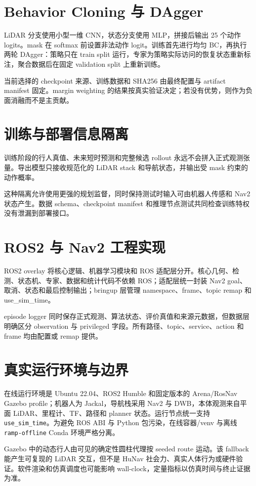 \documentclass[11pt,a4paper]{article}
\begin{document}
\clearpage
\section{Behavior Cloning 与 DAgger}
LiDAR 分支使用小型一维 CNN，状态分支使用 MLP，拼接后输出 25 个动作 logits。mask 在 softmax 前设置非法动作 logit。训练首先进行均匀 BC，再执行两轮 DAgger：策略只在 train split 运行，专家为策略实际访问的恢复状态重新标注，聚合数据后在固定 validation split 上重新训练。

当前选择的 checkpoint 来源、训练数据和 SHA256 由最终配置与 artifact manifest 固定。margin weighting 的结果按真实验证决定；若没有优势，则作为负面消融而不是主贡献。

\section{训练与部署信息隔离}
训练阶段的行人真值、未来短时预测和完整候选 rollout 永远不会拼入正式观测张量。导出模型只接收规范化的 LiDAR stack 和导航状态，并输出受 mask 约束的动作概率。

这种隔离允许使用更强的规划监督，同时保持测试时输入可由机器人传感和 Nav2 状态产生。数据 schema、checkpoint manifest 和推理节点测试共同检查训练特权没有泄漏到部署接口。

\section{ROS2 与 Nav2 工程实现}
ROS2 overlay 将核心逻辑、机器学习模块和 ROS 适配层分开。核心几何、检测、状态机、专家、数据和统计代码不依赖 ROS；适配层统一封装 Nav2 goal、取消、状态和最后控制输出；bringup 层管理 namespace、frame、topic remap 和 use\_sim\_time。

episode logger 同时保存正式观测、算法状态、评价真值和来源元数据，但数据层明确区分 observation 与 privileged 字段。所有路径、topic、service、action 和 frame 均由配置或 remap 提供。

\section{真实运行环境与边界}
在线运行环境是 Ubuntu 22.04、ROS2 Humble 和固定版本的 Arena/RosNav Gazebo profile；机器人为 Jackal，导航栈采用 Nav2 与 DWB，本体观测来自平面 LiDAR、里程计、TF、路径和 planner 状态。运行节点统一支持 \texttt{use\_sim\_time}。为避免 ROS ABI 与 Python 包污染，在线容器/venv 与离线 \texttt{ramp-offline} Conda 环境严格分离。

Gazebo 中的动态行人由可见的确定性圆柱代理按 seeded route 运动。该 fallback 能产生可复现的 LiDAR 交互，但不是 HuNav 社会力、真实人体行为或硬件验证。软件渲染和仿真调度也可能影响 wall-clock，定量指标以仿真时间与终止证据为准。
\end{document}
